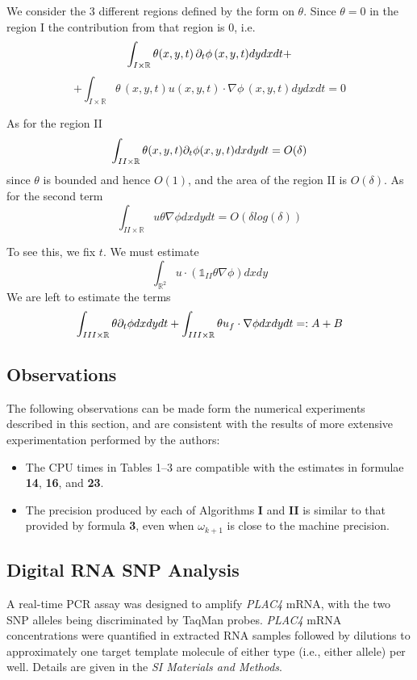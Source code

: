 \documentclass{pnastwo}
\begin{document}
\begin{article}
We consider the 3 different regions defined by the form on
$\theta$. Since $\theta=0$ in the region I the contribution from
that region is 0, i.e.
\[
  \int_{I\times \mathbb{R}}
 \theta(x,y,t)\, \partial_t \phi
\,(x,y,t) dy dx dt+  \]
\[
   +\int_{I\times \mathbb{R}}
 \theta\,(x,y,t) u(x,y,t)\cdot\nabla\phi\,(x,y,t) dydxdt = 0
\]

As for the region II
\[
\int_{II\times \mathbb{R}} \theta (x,y,t) \partial_t\phi (x,y,t)dx dy
dt = O(\delta)
\]
since $\theta$ is bounded and hence $O(1)$, and the area of the
region II is $O(\delta)$. As for the second term
\[
\int_{II\times \mathbb{R}} u \theta \nabla \phi dx dy dt =
O(\delta log(\delta))
\]

To see this, we fix $t$. We must estimate
\[
\int_{\mathbb{R}^2} u\cdot(\mathbb{1}_{II}\theta\nabla\phi) dx dy
\]
We are left to estimate the terms
\[
\int_{III\times \mathbb{R}} \theta \partial_t\phi dx dy
dt+\int_{III\times \mathbb{R}} \theta u_f\cdot \nabla \phi dx dy
dt=:A+B
\]

\subsection{Observations}
The following observations can be made form the numerical experiments
described in this section, and are consistent with the results
of more extensive experimentation performed by the authors:
\begin{itemize}
\item The CPU times in Tables 1--3 are compatible with the estimates in
formulae {\bf 14}, {\bf 16}, and {\bf 23}.
\item
The precision produced by each of Algorithms {\bf I} and {\bf II}
is similar to that provided by formula {\bf 3}, even when
$\omega_{k+1}$ is close to the machine precision.
\end{itemize}




\begin{materials}
\section{Digital RNA SNP Analysis} A real-time PCR assay was designed
to amplify {\it PLAC4} mRNA, with the two SNP alleles being discriminated
by TaqMan probes. {\it PLAC4} mRNA concentrations were quantified in
extracted RNA samples followed by dilutions to approximately one target
template molecule of either type (i.e., either allele) per well.
Details are given in the {\it SI Materials and Methods}.


\end{materials}
\end{article}
\end{document}
